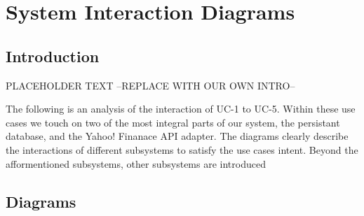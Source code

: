 \chapter{System Interaction Diagrams}


\section{Introduction}
PLACEHOLDER TEXT --REPLACE WITH OUR OWN INTRO--

The following is an analysis of the interaction of UC-1 to
UC-5.  Within these use cases we touch on two of the most
integral parts of our system, the persistant database, and
the Yahoo! Finanace API adapter. The diagrams clearly describe
the interactions of different subsystems to satisfy the use
cases intent. Beyond the afformentioned subsystems, other
subsystems are introduced 

\section{Diagrams}

